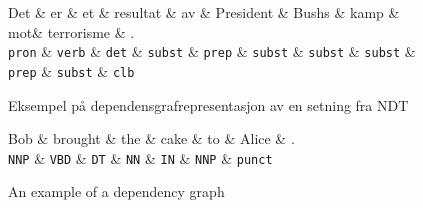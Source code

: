 \begin{figure}
    \smaller[2.5]
    \begin{dependency}[]
        \begin{deptext}[column sep=1em, row sep=.1ex]
            Det \& er \& et \& resultat \& av \& President \& Bushs \& kamp \&
            mot\& terrorisme \& . \\
            \texttt{pron} \& \texttt{verb} \& \texttt{det} \&
            \texttt{subst} \& \texttt{prep} \& \texttt{subst} \&
            \texttt{subst} \& \texttt{subst} \& \texttt{prep} \&
            \texttt{subst} \& \texttt{clb}  \\
        \end{deptext}
    \end{dependency}
    \caption{Eksempel på dependensgrafrepresentasjon av en setning fra NDT}
    \label{exndt}
\end{figure}

\begin{figure}
    \begin{dependency}[]
        \begin{deptext}[column sep=1em, row sep=.1ex]
            Bob \& brought \& the \& cake \& to \& Alice \& . \\
            \texttt{NNP} \& \texttt{VBD} \& \texttt{DT} \&
            \texttt{NN} \& \texttt{IN} \& \texttt{NNP} \&
            \texttt{punct} \\
        \end{deptext}
    \end{dependency}
    \caption{An example of a dependency graph}
    \label{exndt}
\end{figure}

